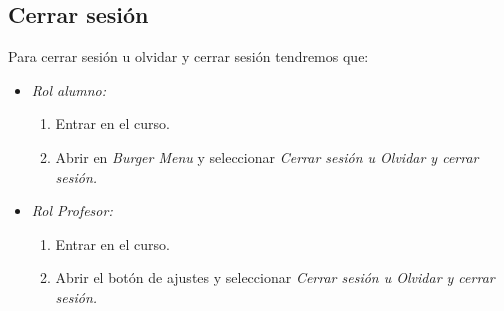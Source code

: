 
\subsection{Cerrar sesión}

Para cerrar sesión u olvidar y cerrar sesión tendremos que:

\begin{itemize}
	\item \emph{Rol alumno:}
	\begin{enumerate}
		\item Entrar en el curso.
		\item Abrir en \emph{Burger Menu} y seleccionar \emph{Cerrar sesión u Olvidar y cerrar sesión.}
	\end{enumerate}
	\item \emph{Rol Profesor:}
		\begin{enumerate}
			\item Entrar en el curso.
			\item Abrir el botón de ajustes y seleccionar \emph{Cerrar sesión u Olvidar y cerrar sesión.}
		\end{enumerate}
\end{itemize}


